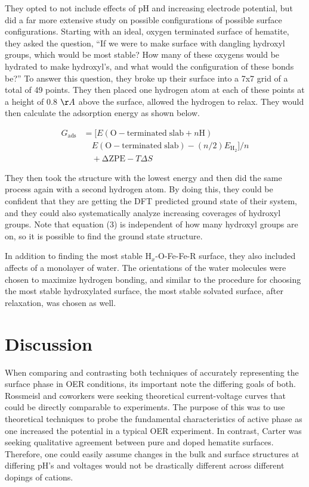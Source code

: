\documentclass[11pt]{article}
\begin{document}
   They opted to not include effects of pH and increasing electrode 
   potential, but did a far more extensive study on possible
   configurations of possible surface configurations.
   Starting with an ideal, oxygen terminated surface of hematite, 
   they asked the question, ``If we were to make surface with dangling 
   hydroxyl groups, which would be most stable? How many of these
   oxygens would be hydrated to make hydroxyl's, and what would the
   configuration of these bonds be?'' 
   To answer this question, they broke up their surface into a 7x7
   grid of a total of 49 points. 
   They then placed one hydrogen atom at each of these points at a height
   of 0.8 $\AA$ above the surface, allowed the hydrogen to
   relax.
   They would then calculate the adsorption energy as shown below.
   
   \begin{equation}
   \begin{split}
   G_{\mathrm{ads}} &= [E(\mathrm{O-terminated\;slab} + n\mathrm{H}) \\
   &\quad E(\mathrm{O-terminated\;slab}) - (n/2)E_{\mathrm{H_2}}]/n \\
   &\quad + \mathrm{\Delta ZPE} - T\Delta S
   \end{split}
   \end{equation}
   
   They then took the structure with the lowest energy and then did the
   same process again with a second hydrogen atom. 
   By doing this, they
   could be confident that they are getting the DFT predicted ground
   state of their system, and they could also systematically analyze
   increasing coverages of hydroxyl groups.
   Note that equation (3) is independent of how many hydroxyl groups are
   on, so it is possible to find the ground state structure.
   
   In addition to finding the most stable H$_{x}$-O-Fe-Fe-R surface, they
   also included affects of a monolayer of water.
   The orientations of the water molecules were chosen to maximize
   hydrogen bonding, and similar to the procedure for choosing the most
   stable hydroxylated surface, the most stable solvated surface, after
   relaxation, was chosen as well.
   
\section{Discussion}
\label{sec-3}

  When comparing and contrasting both techniques of accurately
  representing the surface phase in OER conditions, its important note
  the differing goals of both.
  Rossmeisl and coworkers were seeking
  theoretical current-voltage curves that could be directly comparable
  to experiments.
  The purpose of this was to use theoretical techniques to probe the
  fundamental characteristics of active phase
  as one increased the potential in a typical OER experiment.
  In contrast, Carter was seeking qualitative agreement between pure
  and doped hematite surfaces.
  Therefore, one could easily assume changes in the bulk and surface
  structures at differing pH's and voltages would not be drastically
  different across different dopings of cations.
\end{document}
